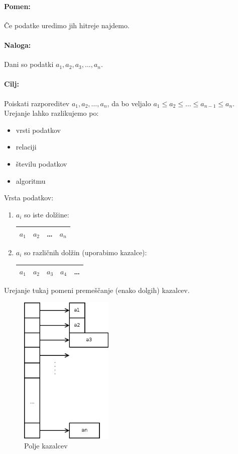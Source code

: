 \documentclass[a4paper,10pt]{article}
\begin{document}
\paragraph{Pomen:}
\v Ce podatke uredimo jih hitreje najdemo.

\paragraph{Naloga:}
Dani so podatki $a_1, a_2, a_3, \ldots, a_n$.

\paragraph{Cilj:}
Poiskati razporeditev $a_1, a_2, \ldots, a_n$, da bo veljalo $a_1 \leq a_2 \leq \ldots \leq a_{n-1} \leq a_n$.\\
Urejanje lahko razlikujemo po:
\begin{itemize}
	\item vrsti podatkov
	\item relaciji
	\item \v{s}tevilu podatkov
	\item algoritmu
\end{itemize}
Vrsta podatkov:
\begin{enumerate}
	\item $a_i$ so iste dol\v{z}ine:
	\begin{tabular}{ | c | c | c | c | }
		\hline
		$a_1$ & $a_2$ & \ldots & $a_n$\\
		\hline
	\end{tabular}
	\item $a_i$ so razli\v{c}nih dol\v{z}in (uporabimo kazalce):
	\begin{tabular}{ | c | c | c | c | c | }
		\hline
		$a_1$ \hspace{0.1cm} & $a_2$ \hspace{0.05cm} & $a_3$ & $a_4$ \hspace{0.35cm} & \ldots\\
		\hline
	\end{tabular}
\end{enumerate}
Urejanje tukaj pomeni preme\v{s}\v{c}anje (enako dolgih) kazalcev.
\begin{figure}[hbt]
	\centering
	\includegraphics[width=4.45cm,height=7.15cm]{Slike/PoljeKazalcev.png}
	\caption{Polje kazalcev}
	\label{Polje kazalcev}
\end{figure}
\end{document}
